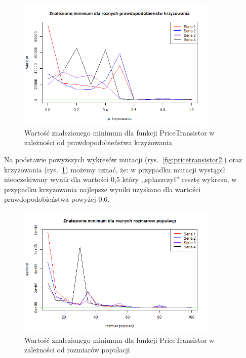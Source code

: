 \documentclass[11pt, a4paper]{article}
\newcommand{\fbi}{\leavevmode{\parindent=1em\indent}}
\begin{document}
\begin{figure}[H]
	\begin{center}
		\includegraphics[width=0.85\textwidth]{./assets/PriceTransistor3.png}
		\caption{Wartość znalezionego minimum dla funkcji PriceTransistor w zależności od prawdopodobieństwa krzyżowania}
		\label{fig:pricetransistor3}
	\end{center}
\end{figure}

\fbi
Na podstawie powyższych wykresów mutacji (rys.~\ref{fig:pricetransistor2}) oraz krzyżowania (rys.~\ref{fig:pricetransistor3}) możemy uznać, że: w przypadku mutacji wystąpił nieoczekiwany wynik dla wartości 0,5 który ,,spłaszczył'' resztę wykresu, w przypadku krzyżowania najlepsze wyniki uzyskano dla wartości prawdopodobieństwa powyżej 0,6.

\begin{figure}[H]
	\begin{center}
		\includegraphics[width=0.85\textwidth]{./assets/PriceTransistor4.png}
		\caption{Wartość znalezionego minimum dla funkcji PriceTransistor w zależności od rozmiarów populacji}
		\label{fig:pricetransistor4}
	\end{center}
\end{figure}
\end{document}
